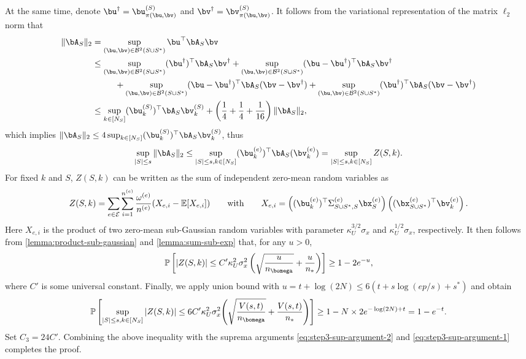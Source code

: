 \documentclass[10pt]{article}
\numberwithin{equation}{section}
\begin{document}
At the same time, denote $\bu^\dagger = \bu^{(S)}_{\pi(\bu,\bv)}$ and $\bv^\dagger = \bv^{(S)}_{\pi(\bu,\bv)}$. It follows from the variational representation of the matrix $\ell_2$ norm that
\begin{align*}
    \|\bA_S\|_2 &= \sup_{(\bu, \bv) \in \mathcal{B}^2(S\cup S^*)} \bu^\top \bA_S \bv \\
    &\le \sup_{(\bu, \bv) \in \mathcal{B}^2(S\cup S^*)} (\bu^\dagger)^\top \bA_S \bv^\dagger + \sup_{(\bu, \bv) \in \mathcal{B}^2(S\cup S^*)} (\bu-\bu^\dagger)^\top \bA_S \bv^\dagger \\
    &~~~~~~~~ + \sup_{(\bu, \bv) \in \mathcal{B}^2(S\cup S^*)} (\bu-\bu^\dagger)^\top \bA_S (\bv - \bv^\dagger) + \sup_{(\bu, \bv) \in \mathcal{B}^2(S\cup S^*)} (\bu^\dagger)^\top \bA_S (\bv - \bv^\dagger) \\
    &\le  \sup_{k \in [N_S]} (\bu^{(S)}_k)^\top \bA_S \bv^{(S)}_k + \left(\frac{1}{4} + \frac{1}{4} + \frac{1}{16} \right) \|\bA_S\|_2, 
\end{align*} which implies $\|\bA_S\|_2 \le 4 \sup_{k \in [N_S]} (\bu^{(S)}_k)^\top \bA_S \bv^{(S)}_k$, thus
\begin{align}
\label{eq:step3-sup-argument-2}
    \sup_{|S| \le s} \|\bA_S\|_2 \le \sup_{|S| \le s, k \in [N_S]} (\bu_{k}^{(e)})^\top \bA_S (\bv_k^{(e)}) = \sup_{|S| \le s, k\in [N_S]} Z(S,k).
\end{align} For fixed $k$ and $S$, $Z(S,k)$ can be written as the sum of independent zero-mean random variables as
\begin{align*}
    Z(S,k) = \sum_{e\in \mathcal{E}} \sum_{i=1}^{n^{(e)}} \frac{\omega^{(e)}}{n^{(e)}} (X_{e,i} - \mathbb{E} [X_{e,i}]) \qquad \text{with} \qquad X_{e,i} = \left((\bu_{k}^{(e)})^\top \Sigma^{(e)}_{S\cup S^*, S} \bx_S^{(e)} \right) \left((\bx_{S\cup S^*}^{(e)})^\top \bv_k^{(e)}\right).
\end{align*} Here $X_{e,i}$ is the product of two zero-mean sub-Gaussian random variables with parameter $\kappa_U^{3/2}\sigma_x$ and $\kappa_U^{1/2}\sigma_x$, respectively. It then follows from \cref{lemma:product-sub-gaussian} and \cref{lemma:sum-sub-exp} that, for any $u>0$,
\begin{align*}
    \mathbb{P}\left[|Z(S,k)| \le C'\kappa_U^2 \sigma_x^2 \left(\sqrt{\frac{u}{n_{\bomega}}} + \frac{u}{n_*}\right)\right] \ge 1-2e^{-u},
\end{align*} where $C'$ is some universal constant. Finally, we apply union bound with $u=t+\log(2N) \le 6(t + s\log(ep/s) + s^*)$ and obtain
\begin{align*}
    \mathbb{P}\left[\sup_{|S| \le s, k\in [N_S]} |Z(S,k)| \le 6C'\kappa_U^2 \sigma_x^2 \Bigg(\sqrt{\frac{V(s,t)}{n_{\bomega}}} + \frac{V(s,t)}{n_*}\Bigg)\right] \ge 1-N\times 2e^{-\log(2N) + t} = 1-e^{-t}.
\end{align*} Set $C_3 = 24C'$. Combining the above inequality with the suprema arguments \eqref{eq:step3-sup-argument-2} and \eqref{eq:step3-sup-argument-1} completes the proof.
\end{document}
